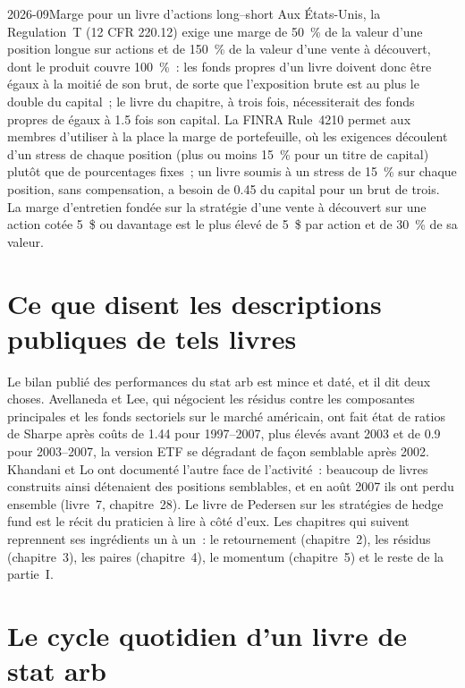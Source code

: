 \begin{dated}{2026-09}{Marge pour un livre d'actions long--short}\label{dat:s1:anatomy-of-a-stat-arb-book:margin}
Aux États-Unis, la Regulation~T (12 CFR 220.12) exige une marge de 50~\% de la valeur d'une position longue sur actions et de 150~\% de la valeur d'une vente à découvert, dont le
produit couvre 100~\%~: les fonds propres d'un livre doivent donc être égaux à la moitié de son brut, de sorte que l'exposition brute est au plus le double du capital~; le livre du chapitre, à trois fois, nécessiterait des fonds propres de
égaux à 1.5 fois son capital. La FINRA Rule~4210 permet aux membres d'utiliser à la place la marge de portefeuille, où les exigences découlent d'un stress de chaque
position (plus ou moins 15~\% pour un titre de capital) plutôt que de pourcentages fixes~; un livre soumis à un stress de 15~\% sur chaque position, sans compensation, a besoin de 0.45
du capital pour un brut de trois. La marge d'entretien fondée sur la stratégie d'une vente à découvert sur une action cotée 5~\$ ou davantage est le plus élevé de 5~\$ par action et de 30~\% de sa valeur.
\end{dated}

\section{Ce que disent les descriptions publiques de tels livres}

Le bilan publié des performances du stat arb est mince et daté, et il dit deux choses. Avellaneda et Lee, qui négocient les résidus contre les composantes principales et
les fonds sectoriels sur le marché américain, ont fait état de ratios de Sharpe après coûts de 1.44 pour 1997--2007, plus élevés avant 2003 et de 0.9 pour 2003--2007, la version ETF
se dégradant de façon semblable après 2002. Khandani et Lo ont documenté l'autre face de l'activité~: beaucoup de livres construits ainsi détenaient des positions semblables, et en août 2007
ils ont perdu ensemble (livre~7, chapitre~28). Le livre de Pedersen sur les stratégies de hedge fund est le récit du praticien à lire à côté d'eux. Les chapitres qui suivent reprennent ses ingrédients un à un~: le retournement
(chapitre~2), les résidus (chapitre~3), les paires (chapitre~4), le momentum (chapitre~5) et le reste de la partie~I.

\section{Le cycle quotidien d'un livre de stat arb}

